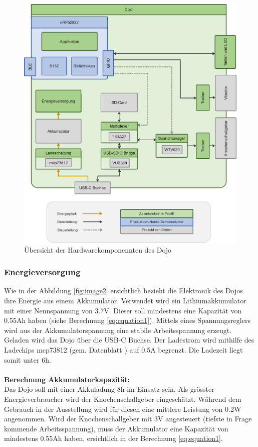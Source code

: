 \documentclass[10pt,a4paper,oneside]{99_fhnwreport}
\begin{document}
\begin{figure}[htb]
\includegraphics[width=\textwidth]{Dojo.png}
\caption{Übersicht der Hardwarekomponennten des Dojo} %
\label{fig:dojo}
\end{figure}

\subsubsection{Energieversorgung}
Wie in der Abbildung \ref{fig:image2} ersichtlich bezieht die Elektronik des Dojos ihre Energie aus einem Akkumulator. Verwendet wird ein Lithiumakkumulator mit einer Nennspannung von 3.7V. Dieser soll mindestens eine Kapazität von 0.55Ah haben (siehe Berechnung \ref{eq:equation1}). Mittels eines Spannungsreglers wird aus der Akkumulatorspannung eine stabile Arbeitsspannung erzeugt. Geladen wird das Dojo über die USB-C Buchse. Der Ladestrom wird mithilfe des Ladechips mcp73812 (gem. Datenblatt \cite{MCP73811}) auf 0.5A begrenzt. Die Ladezeit liegt somit unter 6h.\\
\\
\textbf{Berechnung Akkumulatorkapazität:}\\
Das Dojo soll mit einer Akkuladung 8h im Einsatz sein. Als grösster Energieverbraucher wird der Knochenschallgeber eingeschätzt. Während dem Gebrauch in der Ausstellung wird für diesen eine mittlere Leistung von 0.2W angenommen. Wird der Knochenschallgeber mit 3V angesteuert (tiefste in Frage kommende Arbeitsspannung), muss der Akkumulator eine Kapazität von mindestens 0.55Ah haben, ersichtlich in der Berechnung \ref{eq:equation1}.
\end{document}
